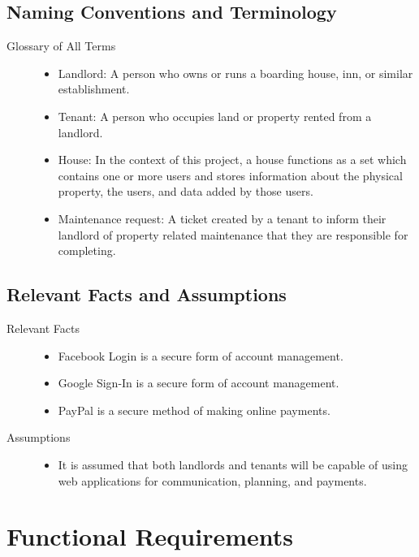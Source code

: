 \documentclass[12pt, titlepage]{article}
\begin{document}
\subsection{Naming Conventions and Terminology} 
\begin{description}
  \item[Glossary of All Terms] \hfill 
    \begin{itemize}
    \item Landlord: A person who owns or runs a boarding house, inn, or similar
      establishment.
    \item Tenant: A person who occupies land or property rented from a landlord.
    \item House: In the context of this project, a house functions as a set
      which contains one or more users and stores information about the
      physical property, the users, and data added by those users.
    \item Maintenance request: A ticket created by a tenant to inform their
      landlord of property related maintenance that they are responsible for
      completing.
    \end{itemize}
\end{description}
\subsection{Relevant Facts and Assumptions} 
\begin{description}
  \item[Relevant Facts] \hfill 
  \begin{itemize}
    \item Facebook Login is a secure form of account management.
    \item Google Sign-In is a secure form of account management.
    \item PayPal is a secure method of making online payments. \\
  \end{itemize}
  \item[Assumptions] \hfill 
  \begin{itemize}
  \item  It is assumed that both landlords and tenants will be capable of using
    web applications for communication, planning, and payments.
  \end{itemize}
\end{description}  

\section{Functional Requirements} 
\end{document}

